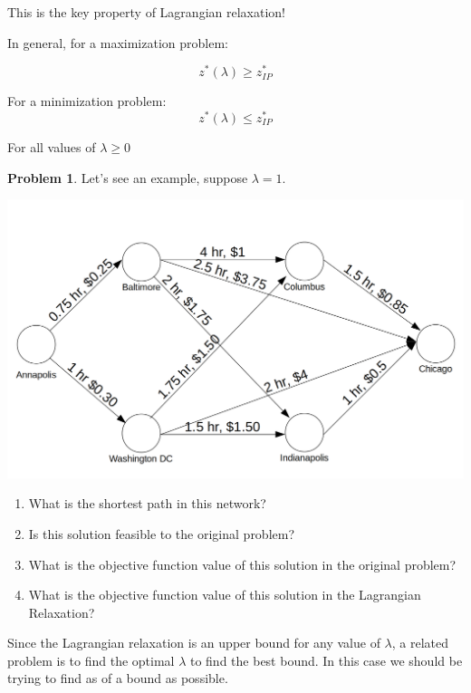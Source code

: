 \documentclass[11pt]{article}
\theoremstyle{definition}
\newtheorem{problem}{Problem}
\newcommand{\answerbox}[3]{%
  \fbox{%
    \begin{minipage}[#1]{#2}
      \hfill\vspace{#3}
    \end{minipage}
  }
}
\newcommand{\wordbox}{\answerbox{c}{1.2in}{.7cm}}
\begin{document}
This is the key property of Lagrangian relaxation!

\begin{tcolorbox}
In general, for a maximization problem:

\[
z^*(\lambda) \geq z^*_{IP}
\]
 
For a minimization problem:
\[
z^*(\lambda) \leq z^*_{IP}
\]

For all values of $\lambda \geq 0$

\end{tcolorbox}

\newpage

\begin{problem}
Let's see an example, suppose $\lambda = 1$.

\begin{center}
\includegraphics[width=6in]{Short-path.png}
\end{center}
\end{problem}
\begin{enumerate}
\item What is the shortest path in this network? \vfill
\item Is this solution feasible to the original problem? \vfill
\item What is the objective function value of this solution in the original problem? \vfill
\item What is the objective function value of this solution in the Lagrangian Relaxation? \vfill
\end{enumerate}

\newpage


Since the Lagrangian relaxation is an upper bound for any value of $\lambda$, a related problem is to find the optimal $\lambda$ to find the best bound. In this case we should be trying to find as \wordbox of a bound as possible.
\end{document}

